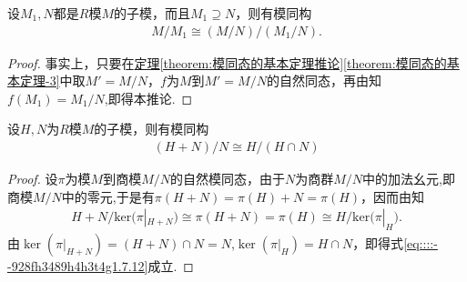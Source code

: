 \documentclass[../../main.tex]{subfiles}%
\begin{document}
\begin{corollary}
设$M_1, N$都是$R$模$M$的子模，而且$M_1 \supseteq N$，则有模同构\begin{align*}
M/M_1\cong (M/N)/(M_1/N).
\end{align*}
\end{corollary}
\begin{proof}
事实上，只要在\hyperref[theorem:模同态的基本定理推论]{定理\ref{theorem:模同态的基本定理推论}\ref{theorem:模同态的基本定理-3}}中取$M' = M/N$，$f$为$M$到$M' = M/N$的自然同态，再由知$f(M_1)=M_1/N$,即得本推论.
\end{proof}

\begin{theorem}
设$H, N$为$R$模$M$的子模，则有模同构
\begin{align}
(H + N)/N \cong H/(H \cap N) \label{eq::::--928fh3489h4h3t4g1.7.12}
\end{align}
\end{theorem}

\begin{proof}
设$\pi$为模$M$到商模$M/N$的自然模同态，由于$N$为商群$M/N$中的加法幺元,即商模$M/N$中的零元,于是有$\pi(H + N) =\pi(H)+N= \pi(H)$，因而由知
\begin{align*}
H+N/\mathrm{ker(}\pi |_{H+N})\cong \pi \left( H+N \right) =\pi \left( H \right) \cong H/\mathrm{ker(}\pi |_H).
\end{align*}
由$\ker(\pi|_{H + N}) = (H + N)\cap N =N$,$\ker(\pi|_H) = H \cap N$，即得式\eqref{eq::::--928fh3489h4h3t4g1.7.12}成立.
\end{proof}
\end{document}
